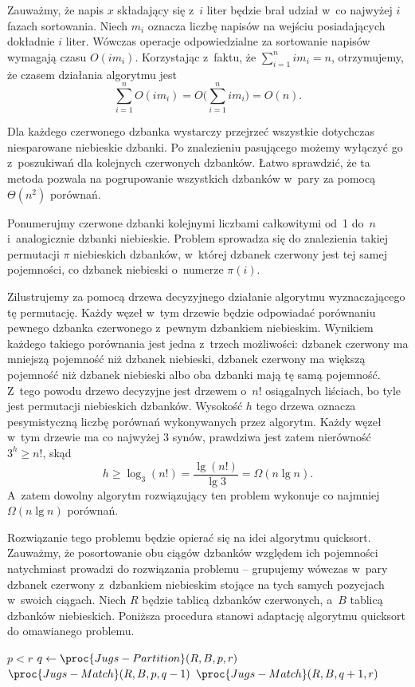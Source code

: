 Zauważmy, że napis $x$ składający się z~$i$ liter będzie brał udział w~co najwyżej $i$ fazach sortowania.
Niech $m_i$ oznacza liczbę napisów na wejściu posiadających dokładnie $i$ liter.
Wówczas operacje odpowiedzialne za sortowanie napisów  wymagają czasu $O(im_i)$.
Korzystając z~faktu, że $\sum_{i=1}^nim_i=n$, otrzymujemy, że czasem działania algorytmu jest
\[
    \sum_{i=1}^nO(im_i) = O\biggl(\sum_{i=1}^nim_i\biggr) = O(n).
\]


\subproblem %
Dla każdego czerwonego dzbanka wystarczy przejrzeć wszystkie dotychczas niesparowane niebieskie dzbanki.
Po znalezieniu pasującego możemy wyłączyć go z~poszukiwań dla kolejnych czerwonych dzbanków.
Łatwo sprawdzić, że ta metoda pozwala na pogrupowanie wszystkich dzbanków w~pary za pomocą $\Theta(n^2)$ porównań.

\subproblem %
Ponumerujmy czerwone dzbanki kolejnymi liczbami całkowitymi od~1 do~$n$ i~analogicznie dzbanki niebieskie.
Problem sprowadza się do znalezienia takiej permutacji $\pi$ niebieskich dzbanków, w~której  dzbanek czerwony jest tej samej pojemności, co dzbanek niebieski o~numerze $\pi(i)$.

Zilustrujemy za pomocą drzewa decyzyjnego działanie algorytmu wyznaczającego tę permutację.
Każdy węzeł w~tym drzewie będzie odpowiadać porównaniu pewnego dzbanka czerwonego z~pewnym dzbankiem niebieskim.
Wynikiem każdego takiego porównania jest jedna z~trzech możliwości: dzbanek czerwony ma mniejszą pojemność niż dzbanek niebieski, dzbanek czerwony ma większą pojemność niż dzbanek niebieski albo oba dzbanki mają tę samą pojemność.
Z~tego powodu drzewo decyzyjne jest drzewem  o~$n!$ osiągalnych liściach, bo tyle jest permutacji niebieskich dzbanków.
Wysokość $h$ tego drzewa oznacza pesymistyczną liczbę porównań wykonywanych przez algorytm.
Każdy węzeł w~tym drzewie ma co najwyżej 3 synów, prawdziwa jest zatem nierówność $3^h\ge n!$, skąd
\[
	h \ge \log_3(n!) = \frac{\lg(n!)}{\lg3} = \Omega(n\lg n).
\]
A~zatem dowolny algorytm rozwiązujący ten problem wykonuje co najmniej $\Omega(n\lg n)$ porównań.

\subproblem %
Rozwiązanie tego problemu będzie opierać się na idei algorytmu quicksort.
Zauważmy, że posortowanie obu ciągów dzbanków względem ich pojemności natychmiast prowadzi do rozwiązania problemu -- grupujemy wówczas w~pary dzbanek czerwony z~dzbankiem niebieskim stojące na tych samych pozycjach w~swoich ciągach.
Niech $R$ będzie tablicą dzbanków czerwonych, a~$B$ tablicą dzbanków niebieskich.
Poniższa procedura stanowi adaptację algorytmu quicksort do omawianego problemu.
\begin{codebox}
\li	\If $p<r$
\li		\Then
			$q\gets\proc{Jugs-Partition}(R,B,p,r)$
\li			$\proc{Jugs-Match}(R,B,p,q-1)$
\li			$\proc{Jugs-Match}(R,B,q+1,r)$
		\End
\end{codebox}

